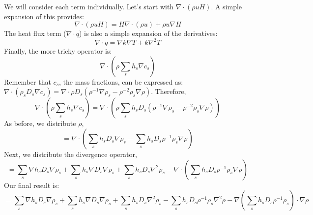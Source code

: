 \documentclass[10pt]{article}
\begin{document}
We will consider each term individually. Let's start with $\nabla \cdot (\rho u H)$. A simple expansion of this provides:
\begin{equation}
  \nabla \cdot (\rho u H) = H \nabla \cdot (\rho u) + \rho u \nabla H 
\end{equation}
The heat flux term ($\nabla \cdot q$) is also a simple expansion of the derivatives:
\begin{equation}
  \nabla \cdot q = \nabla k \nabla T + k \nabla^2 T
\end{equation}
Finally, the more tricky operator is:
\begin{equation}
  \nabla \cdot (\rho \sum_s h_s \nabla c_s)
\end{equation}
Remember that $c_s$, the mass fractions, can be expressed as: $\nabla \cdot (\rho_s D_s \nabla c_s) = \nabla \cdot \rho D_s (\rho^{-1} \nabla \rho_s - \rho^{-2} \rho_s \nabla \rho)$. 
Therefore, 
\begin{equation}
  \nabla \cdot (\rho \sum_s h_s \nabla c_s) = \nabla \cdot (\rho \sum_s h_s D_s ( \rho^{-1} \nabla \rho_s - \rho^{-2} \rho_s \nabla \rho))
\end{equation}
As before, we distribute $\rho$,
\begin{equation}
  = \nabla \cdot (\sum_s h_s D_s \nabla \rho_s - \sum_s h_s D_s \rho^{-1} \rho_s \nabla \rho)
\end{equation}
Next, we distribute the divergence operator,
\begin{equation}
  = \sum_s \nabla h_s D_s \nabla \rho_s + \sum_s h_s \nabla D_s \nabla \rho_s + \sum_s h_s D_s \nabla^2 \rho_s - \nabla \cdot (\sum_s h_s D_s \rho^{-1} \rho_s \nabla \rho)
\end{equation}
Our final result is:
\begin{equation}
  = \sum_s \nabla h_s D_s \nabla \rho_s + \sum_s h_s \nabla D_s \nabla \rho_s + \sum_s h_s D_s \nabla^2 \rho_s - \sum_s h_s D_s \rho^{-1} \rho_s \nabla^2 \rho - \nabla (\sum_s h_s D_s \rho^{-1} \rho_s) \cdot \nabla \rho 
\end{equation}
\end{document}
